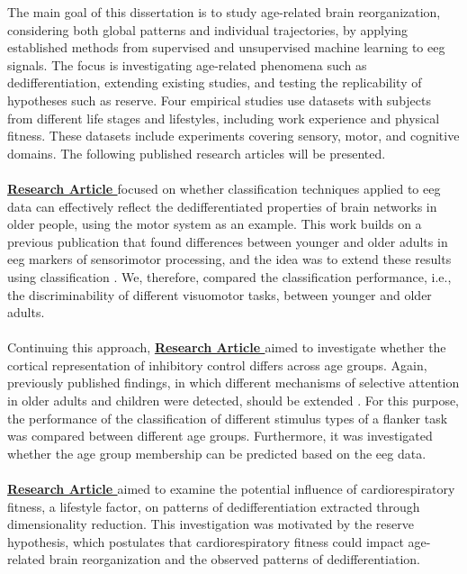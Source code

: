 The main goal of this dissertation is to study age-related brain reorganization, considering both global patterns and individual trajectories, by applying established methods from supervised and unsupervised machine learning to \gls{eeg} signals. The focus is investigating age-related phenomena such as dedifferentiation, extending existing studies, and testing the replicability of hypotheses such as reserve. Four empirical studies use datasets with subjects from different life stages and lifestyles, including work experience and physical fitness. These datasets include experiments covering sensory, motor, and cognitive domains. The following published research articles will be presented.\\
\\
\textbf{\hyperref[paperI]{Research Article }} focused on whether classification techniques applied to \gls{eeg} data can effectively reflect the dedifferentiated properties of brain networks in older people, using the motor system as an example. This work builds on a previous publication that found differences between younger and older adults in \gls{eeg} markers of sensorimotor processing, and the idea was to extend these results using classification \cite{vieluf2018age}. 
We, therefore, compared the classification performance, i.e., the discriminability of different visuomotor tasks, between younger and older adults.\\
\\
Continuing this approach, \textbf{\hyperref[paperII]{Research Article }} aimed to investigate whether the cortical representation of inhibitory control differs across age groups. Again, previously published findings, in which different mechanisms of selective attention in older adults and children were detected, should be extended \cite{Reuter2019}. For this purpose, the performance of the classification of different stimulus types of a flanker task was compared between different age groups. Furthermore, it was investigated whether the age group membership can be predicted based on the \gls{eeg} data.\\
\\
\textbf{\hyperref[paperIII]{Research Article }} aimed to examine the potential influence of cardiorespiratory fitness, a lifestyle factor, on patterns of dedifferentiation extracted through dimensionality reduction. This investigation was motivated by the reserve hypothesis, which postulates that cardiorespiratory fitness could impact age-related brain reorganization and the observed patterns of dedifferentiation.\\
